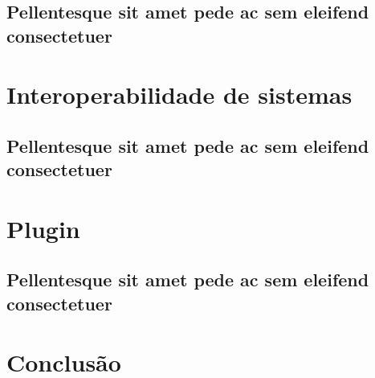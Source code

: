 \documentclass[
	12pt,				%
	openright,			%
	oneside,			%
	a4paper,			%
	english,			%
	french,				%
	spanish,			%
	brazil				%
	]{abntex2}
\begin{document}
\section{Pellentesque sit amet pede ac sem eleifend consectetuer}

\lipsum[24]

\chapter{Interoperabilidade de sistemas}
\section{Pellentesque sit amet pede ac sem eleifend consectetuer}

\lipsum[24]

\chapter{Plugin}
\section{Pellentesque sit amet pede ac sem eleifend consectetuer}

\lipsum[24]


\chapter{Conclusão}

\lipsum[31-33]

\postextual


\end{document}
